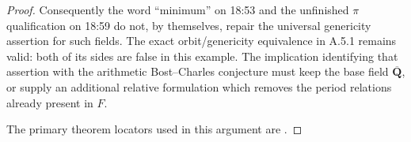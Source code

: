 \begin{proof}
Consequently the word ``minimum'' on 18:53 and the unfinished \(\pi\)
qualification on 18:59 do not, by themselves, repair the universal
genericity assertion for such fields. The exact orbit/genericity
equivalence in A.5.1 remains valid: both of its sides are false in this
example. The implication identifying that assertion with the arithmetic
Bost--Charles conjecture must keep the base field
\(\overline{\mathbf Q}\), or supply an additional relative formulation
which removes the period relations already present in \(F\).

The primary theorem locators used in this argument are \cite[Proposition 2.21; Theorem 6.20 and Proposition 6.21]{GenDeligneMilne}.
\end{proof}

